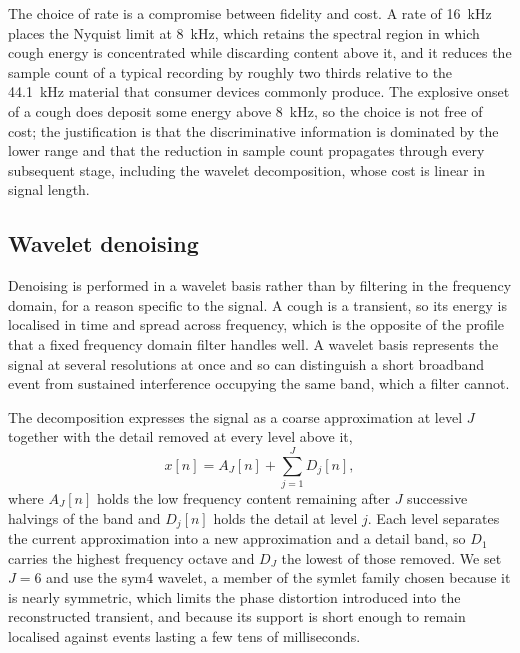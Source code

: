 \documentclass[pdflatex,sn-mathphys-num]{sn-jnl}
\begin{document}
The choice of rate is a compromise between fidelity and cost. A rate of
16~kHz places the Nyquist limit at 8~kHz, which retains the spectral region in
which cough energy is concentrated while discarding content above it, and it
reduces the sample count of a typical recording by roughly two thirds relative
to the 44.1~kHz material that consumer devices commonly produce. The explosive
onset of a cough does deposit some energy above 8~kHz, so the choice is not
free of cost; the justification is that the discriminative information is
dominated by the lower range and that the reduction in sample count propagates
through every subsequent stage, including the wavelet decomposition, whose
cost is linear in signal length.

\subsection{Wavelet denoising}\label{sec:d-wav}

Denoising is performed in a wavelet basis rather than by filtering in the
frequency domain, for a reason specific to the signal. A cough is a transient,
so its energy is localised in time and spread across frequency, which is the
opposite of the profile that a fixed frequency domain filter handles well. A
wavelet basis represents the signal at several resolutions at once and so can
distinguish a short broadband event from sustained interference occupying the
same band, which a filter cannot.

The decomposition expresses the signal as a coarse approximation at level $J$
together with the detail removed at every level above it,
\begin{equation}
x[n] = A_J[n] + \sum_{j=1}^{J} D_j[n],
\label{eq:mra}
\end{equation}
where $A_J[n]$ holds the low frequency content remaining after $J$ successive
halvings of the band and $D_j[n]$ holds the detail at level $j$. Each
level separates the current approximation into a new approximation and a
detail band, so $D_1$ carries the highest frequency octave and $D_J$ the
lowest of those removed. We set $J = 6$ and use the sym4 wavelet, a member of
the symlet family chosen because it is nearly symmetric, which limits the
phase distortion introduced into the reconstructed transient, and because its
support is short enough to remain localised against events lasting a few tens
of milliseconds.
\end{document}
